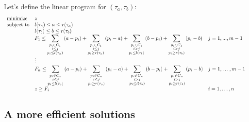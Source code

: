 \documentclass{article}
\theoremstyle{remark}
\theoremstyle{definition}
\begin{document}
Let's define the linear program for $(\tau_a, \tau_b)$:
\begin{equation*}
\begin{array}{ll@{}ll}
\text{minimize}  & z\\
\text{subject to}&
l(\tau_a) \leq a \leq r(\tau_a) \\
&l(\tau_b) \leq b \leq r(\tau_b) \\
&F_1 \leq 
\displaystyle\sum\limits_{\substack{p_i \in C_1\\ i\leq j \\ p_i \leq l(\tau_a)}}{(a - p_i)} +   
\displaystyle\sum\limits_{\substack{p_i \in C_1\\ i\leq j \\ p_i \geq r(\tau_a)}}{(p_i - a)} +   
\displaystyle\sum\limits_{\substack{p_i \in C_1\\ i>j     \\ p_i \leq l(\tau_b)}}{(b - p_i)} +   
\displaystyle\sum\limits_{\substack{p_i \in C_1\\ i>j     \\ p_i \geq r(\tau_b)}}{(p_i - b)}   
&&j=1,...,m-1\\

&\vdots\\
&F_n \leq 
\displaystyle\sum\limits_{\substack{p_i \in C_n\\ i\leq j \\ p_i \leq l(\tau_a)}}{(a - p_i)} +   
\displaystyle\sum\limits_{\substack{p_i \in C_n\\ i\leq j \\ p_i \geq r(\tau_a)}}{(p_i - a)} +   
\displaystyle\sum\limits_{\substack{p_i \in C_n\\ i>j     \\ p_i \leq l(\tau_b)}}{(b - p_i)} +   
\displaystyle\sum\limits_{\substack{p_i \in C_n\\ i>j     \\ p_i \geq r(\tau_b)}}{(p_i - b)}   
&&j=1,\ldots,m-1\\
&z \geq F_i &&i=1,\ldots,n
\end{array}
\end{equation*}


\subsection{A more efficient solutions}
\end{document}
